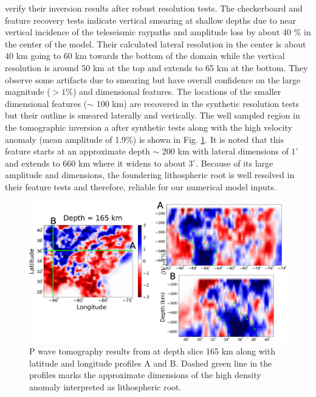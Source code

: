 \documentclass[draft,linenumbers]{agujournal2018}
\begin{document}
    \citet{Biryol_2016} verify their inversion results after robust resolution tests. The checkerboard and feature recovery tests indicate vertical smearing at shallow depths due to near vertical incidence of the teleseismic raypaths and amplitude loss by about 40 \% in the center of the model. Their calculated lateral resolution in the center is about 40 km going to 60 km towards the bottom of the domain while the vertical resolution  is around 50 km at the top and extends to 65 km at the bottom. They observe some artifacts due to smearing but have overall confidence on the large magnitude ($> 1\%$) and dimensional features. The locations of the smaller dimensional features ($\sim$ 100 km) are recovered in the synthetic resolution tests but their outline is smeared laterally and vertically. The well sampled region  in the tomographic inversion a after synthetic tests along with the high velocity anomaly (mean amplitude of 1.9\%) is shown in Fig. \ref{fig_tomo}. It is noted that this feature starts at an approximate depth $\sim$ 200 km with lateral dimensions of $1^\circ$ and extends to 660 km where it widens to about $3^\circ$. Because of its large amplitude and dimensions, the foundering lithospheric root is well resolved in their feature tests and therefore, reliable for our numerical model inputs. 

\begin{figure}[ht]
    \centering
    \includegraphics[width=\linewidth]{figures/figure_tomography.png}
    \caption{P wave tomography results from \citep{Biryol_2016} at depth slice 165 km along with latitude and longitude profiles A and B. Dashed green line in the profiles marks the approximate dimensions of the high density anomaly interpreted as lithospheric root. }
    \label{fig_tomo}
 \end{figure}
\end{document}
